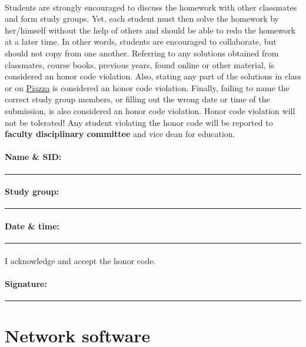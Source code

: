 \documentclass[11pt,a4paper]{article}
\begin{document}
\paragraph{} Students are strongly encouraged to discuss the homework with other classmates and form study groups. Yet, each student must then solve the homework by her/himself without the help of others and should be able to redo the homework at a later time. In other words, students are encouraged to collaborate, but should not copy from one another. Referring to any solutions obtained from classmates, course books, previous years, found online or other material, is considered an honor code violation. Also, stating any part of the solutions in class or on \href{https://piazza.com/class/kkn1oz577n2sq}{Piazza} is considered an honor code violation. Finally, failing to name the correct study group members, or filling out the wrong date or time of the submission, is also considered an honor code violation. Honor code violation will not be tolerated! Any student violating the honor code will be reported to {\bf\color{LimeGreen} faculty disciplinary committee} and vice dean for education.

\vspace*{0.15in}
\paragraph{Name \& SID:} \rule{4.5in}{0.5pt}
\paragraph{Study group:} \rule{4.5in}{0.5pt}
\paragraph{Date \& time:} \rule{2.5in}{0.5pt}
\paragraph{} I acknowledge and accept the honor code.
\paragraph{Signature:} \rule{2.5in}{0.5pt}

\pagebreak

\section{Network software}
\end{document}
